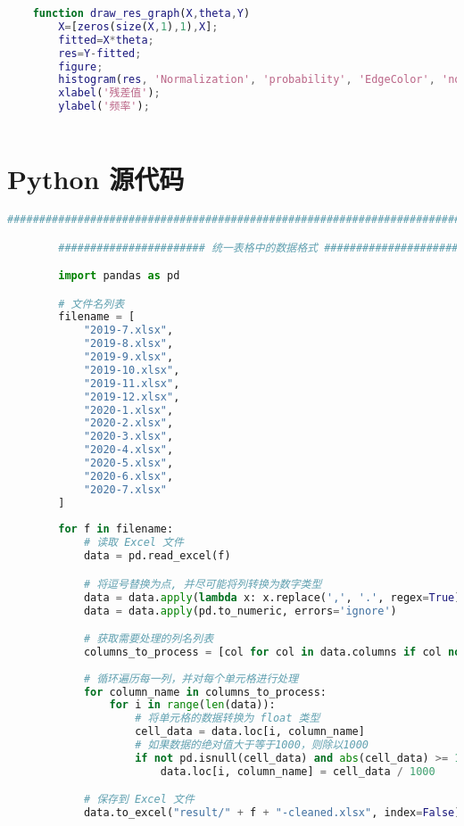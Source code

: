 \documentclass[withoutpreface,bwprint]{cumcmthesis}  %
\begin{document}
\begin{appendices}
\begin{lstlisting}[language=matlab]
    % 频率-残差直方图
    function draw_res_graph(X,theta,Y)
        X=[zeros(size(X,1),1),X];
        fitted=X*theta;
        res=Y-fitted;
        figure;
        histogram(res, 'Normalization', 'probability', 'EdgeColor', 'none');
        xlabel('残差值');
        ylabel('频率');
   
		\end{lstlisting}

  
		\section{Python 源代码}
		\begin{lstlisting}[language=python]
		#####################################################################################

        ####################### 统一表格中的数据格式 #######################

        import pandas as pd 

        # 文件名列表
        filename = [
            "2019-7.xlsx",
            "2019-8.xlsx",
            "2019-9.xlsx",
            "2019-10.xlsx",
            "2019-11.xlsx",
            "2019-12.xlsx",
            "2020-1.xlsx",
            "2020-2.xlsx",
            "2020-3.xlsx",
            "2020-4.xlsx",
            "2020-5.xlsx",
            "2020-6.xlsx",
            "2020-7.xlsx"
        ]
            
        for f in filename:
            # 读取 Excel 文件
            data = pd.read_excel(f)

            # 将逗号替换为点, 并尽可能将列转换为数字类型
            data = data.apply(lambda x: x.replace(',', '.', regex=True) if x.dtype == 'object' else x)
            data = data.apply(pd.to_numeric, errors='ignore')

            # 获取需要处理的列名列表
            columns_to_process = [col for col in data.columns if col not in ['Date/Time', 'longitude', 'latitude', 'altitude [m]']]
    
            # 循环遍历每一列，并对每个单元格进行处理
            for column_name in columns_to_process:
                for i in range(len(data)):
                    # 将单元格的数据转换为 float 类型
                    cell_data = data.loc[i, column_name]
                    # 如果数据的绝对值大于等于1000，则除以1000
                    if not pd.isnull(cell_data) and abs(cell_data) >= 1000:
                        data.loc[i, column_name] = cell_data / 1000

            # 保存到 Excel 文件
            data.to_excel("result/" + f + "-cleaned.xlsx", index=False)


\end{lstlisting}
\end{appendices}
\end{document}

